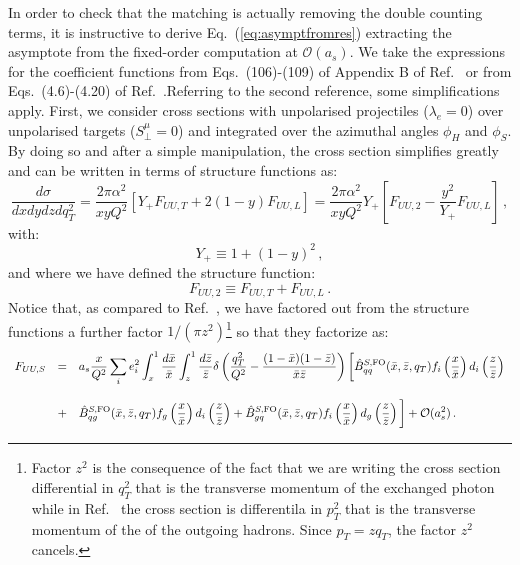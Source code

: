 \documentclass[10pt,a4paper]{article}
\begin{document}
In order to check that the matching is actually removing the double
counting terms, it is instructive to derive
Eq.~(\ref{eq:asymptfromres}) extracting the asymptote from the
fixed-order computation at $\mathcal{O}(a_s)$. We take the expressions
for the coefficient functions from Eqs.~(106)-(109) of Appendix B of
Ref.~\cite{Nadolsky:1999kb} or from Eqs.~(4.6)-(4.20) of
Ref.~\cite{Bacchetta:2008xw}.Referring to the second reference, some
simplifications apply. First, we consider cross sections with
unpolarised projectiles ($\lambda_e=0$) over unpolarised targets
($S_\perp^\mu = 0$) and integrated over the azimuthal angles $\phi_H$
and $\phi_S$. By doing so and after a simple manipulation, the cross
section simplifies greatly and can be written in terms of structure
functions as:
\begin{equation}\label{eq:xsexinsf}
  \frac{d\sigma}{dx dy dz dq_T^2} = \frac{2\pi\alpha^2}{xyQ^2}\left[Y_+ F_{UU,T}+2(1-y)F_{UU,L}\right]=\frac{2\pi\alpha^2}{xyQ^2}Y_+\left[F_{UU,2}-\frac{y^2}{Y_+}F_{UU,L}\right]\,,
\end{equation}
with:
\begin{equation}
Y_+\equiv 1+(1-y)^2\,,
\end{equation}
and where we have defined the structure function:
\begin{equation}
F_{UU,2}\equiv F_{UU,T} + F_{UU,L}\,.
\end{equation}
Notice that, as compared to Ref.~\cite{Bacchetta:2008xw}, we have
factored out from the structure functions a further factor
$1/(\pi z^2)$\footnote{Factor $z^2$ is the consequence of the fact
  that we are writing the cross section differential in $q_T^2$ that
  is the transverse momentum of the exchanged photon while in
  Ref.~\cite{Bacchetta:2008xw} the cross section is differentila in
  $p_T^2$ that is the transverse momentum of the of the outgoing
  hadrons. Since $p_T=z q_T$, the factor $z^2$ cancels.} so that they
factorize as:
\begin{equation}\label{eq:FOxsec}
\begin{array}{rcl}
  F_{UU,S}&=&\displaystyle 
  a_s\frac{x}{Q^2}\sum_{i}e_i^2\int_x^1\frac{d\bar{x}}{\bar{x}}\int_z^1\frac{d\bar{z}}{\bar{z}}\delta\left(\frac{q_T^2}{Q^2}-\frac{(1-\bar{x})(1-\bar{z})}{\bar{x}\bar{z}}\right)\bigg[\hat{B}_{qq}^{S,
    \rm FO}(\bar{x},\bar{z},q_T)f_i\left(\frac{x}{\bar{x}}\right)
              d_i\left(\frac{z}{\bar{z}}\right)\\
\\
&+&\displaystyle \hat{B}_{qg}^{S,
    \rm FO}(\bar{x},\bar{z},q_T)f_g\left(\frac{x}{\bar{x}}\right)
              d_i\left(\frac{z}{\bar{z}}\right)+ \hat{B}_{gq}^{S,
    \rm FO}(\bar{x},\bar{z},q_T)f_i\left(\frac{x}{\bar{x}}\right)
              d_g\left(\frac{z}{\bar{z}}\right)\bigg]
+\mathcal{O}(a_s^2)\,.
\end{array}
\end{equation}
\end{document}

